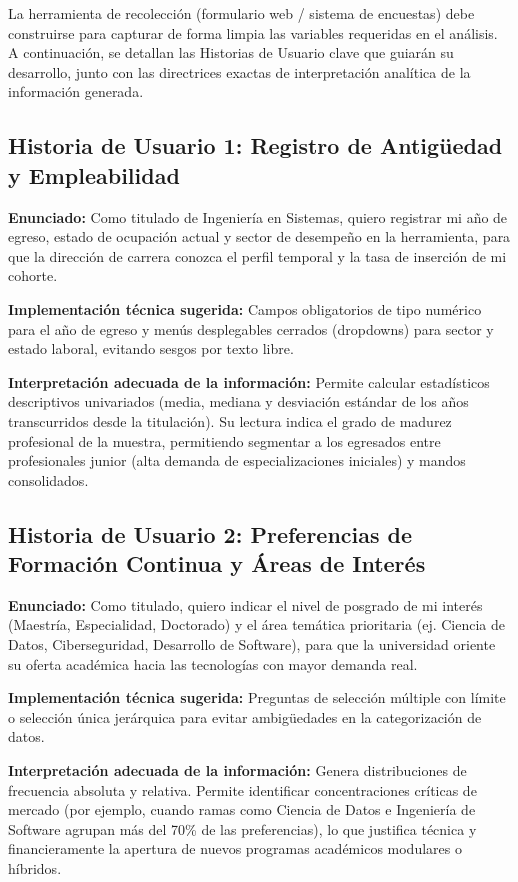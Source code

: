 \documentclass[12pt]{article}
\begin{document}
La herramienta de recolección (formulario web / sistema de encuestas) debe
construirse para capturar de forma limpia las variables requeridas en el
análisis. A continuación, se detallan las Historias de Usuario clave que
guiarán su desarrollo, junto con las directrices exactas de interpretación
analítica de la información generada.

\subsection*{Historia de Usuario 1: Registro de Antigüedad y Empleabilidad}

\textbf{Enunciado:} Como titulado de Ingeniería en Sistemas, quiero
registrar mi año de egreso, estado de ocupación actual y sector de
desempeño en la herramienta, para que la dirección de carrera conozca el
perfil temporal y la tasa de inserción de mi cohorte.

\textbf{Implementación técnica sugerida:} Campos obligatorios de tipo
numérico para el año de egreso y menús desplegables cerrados (dropdowns)
para sector y estado laboral, evitando sesgos por texto libre.

\textbf{Interpretación adecuada de la información:} Permite calcular
estadísticos descriptivos univariados (media, mediana y desviación
estándar de los años transcurridos desde la titulación). Su lectura indica
el grado de madurez profesional de la muestra, permitiendo segmentar a los
egresados entre profesionales junior (alta demanda de especializaciones
iniciales) y mandos consolidados.

\subsection*{Historia de Usuario 2: Preferencias de Formación Continua y Áreas de Interés}

\textbf{Enunciado:} Como titulado, quiero indicar el nivel de posgrado de
mi interés (Maestría, Especialidad, Doctorado) y el área temática
prioritaria (ej. Ciencia de Datos, Ciberseguridad, Desarrollo de
Software), para que la universidad oriente su oferta académica hacia las
tecnologías con mayor demanda real.

\textbf{Implementación técnica sugerida:} Preguntas de selección múltiple
con límite o selección única jerárquica para evitar ambigüedades en la
categorización de datos.

\textbf{Interpretación adecuada de la información:} Genera distribuciones
de frecuencia absoluta y relativa. Permite identificar concentraciones
críticas de mercado (por ejemplo, cuando ramas como Ciencia de Datos e
Ingeniería de Software agrupan más del 70\% de las preferencias), lo que
justifica técnica y financieramente la apertura de nuevos programas
académicos modulares o híbridos.
\end{document}
